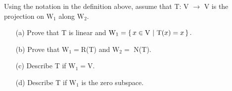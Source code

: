 Using the notation in the definition above, assume that T: V $\rightarrow$ V is the projection on $\mathrm{W}_1$ along $\mathrm{W}_2$.

\begin{enumerate}
	\item[(a)] Prove that T is linear and $\mathrm{W}_1 = \left\{ \,x \in \mathrm{V} ~|~ \mathrm{T}(x) = x \,\right\}.$
	\item[(b)] Prove that $\mathrm{W}_1 = $R(T) and $\mathrm{W}_2 =$ N(T).
	\item[(c)] Describe T if $\mathrm{W}_1 = \mathrm{V}$.
	\item[(d)] Describe T if $\mathrm{W}_1$ is the zero subspace.
\end{enumerate}

\begin{tcolorbox}
\begin{solution}
	
	
\end{solution}

\end{tcolorbox}